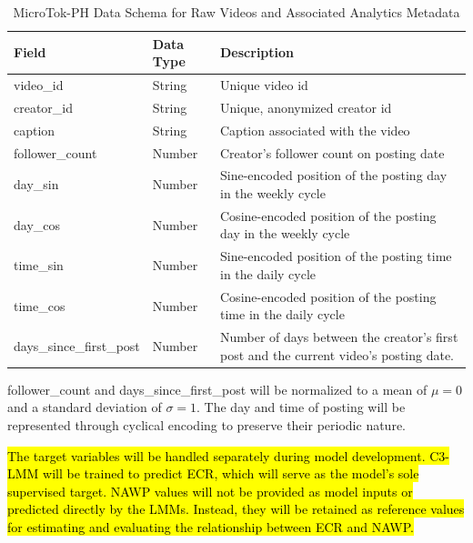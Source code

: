 \begin{table}[H]
    \centering
    \begin{tabular}{llp{8cm}}
        \toprule
        \textbf{Field}  & \textbf{Data Type} & \textbf{Description} \\
        \midrule
        video\_id  & String & Unique video id \\
        creator\_id  & String & Unique, anonymized creator id \\
        caption & String & Caption associated with the video \\
        follower\_count & Number & Creator's follower count on posting date \\
        day\_sin & Number & Sine-encoded position of the posting day in the weekly cycle \\
        day\_cos & Number & Cosine-encoded position of the posting day in the weekly cycle \\
        time\_sin & Number & Sine-encoded position of the posting time in the daily cycle \\
        time\_cos & Number & Cosine-encoded position of the posting time in the daily cycle \\
        days\_since\_first\_post & Number & Number of days between the creator's first post and the current video's posting date. \\
        \bottomrule
    \end{tabular}
    \caption{MicroTok-PH Data Schema for Raw Videos and Associated Analytics Metadata}
    \label{tab:schema}
\end{table}

follower\_count and days\_since\_first\_post will be normalized to a mean of $\mu=0$ and a standard deviation of $\sigma=1$. The day and time of posting will be represented through cyclical encoding to preserve their periodic nature. 

\hl{The target variables will be handled separately during model development. C3-LMM will be trained to predict ECR, which will serve as the model's sole supervised target. NAWP values will not be provided as model inputs or predicted directly by the LMMs. Instead, they will be retained as reference values for estimating and evaluating the relationship between ECR and NAWP.}

